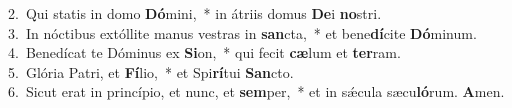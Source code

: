 {2.~}Qui statis in domo \textbf{Dó}mini,~* in átriis domus \textbf{De}i \textbf{no}stri.\\
{3.~}In nóctibus extóllite manus vestras in \textbf{san}cta,~* et bene\textbf{dí}cite \textbf{Dó}minum.\\
{4.~}Benedícat te Dóminus ex \textbf{Si}on,~* qui fecit \textbf{cæ}lum et \textbf{ter}ram.\\
{5.~}Glória Patri, et \textbf{Fí}lio,~* et Spi\textbf{rí}tui \textbf{San}cto.\\
{6.~}Sicut erat in princípio, et nunc, et \textbf{sem}per,~* et in sǽcula sæcu\textbf{ló}rum. \textbf{A}men.\\
